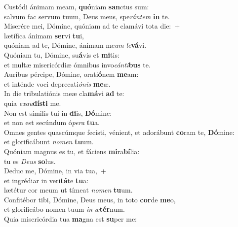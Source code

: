 \evenverse Custódi ánimam meam, \textbf{quó}niam \textbf{san}ctus sum:~\*\\
\evenverse salvum fac servum tuum, Deus meus, spe\textit{rán}\textit{tem} \textbf{in} te.\\
\oddverse Miserére mei, Dómine, quóniam ad te clamávi tota die:~+\\
\oddverse  lætífica ánimam \textbf{ser}vi \textbf{tu}i,~\*\\
\oddverse quóniam ad te, Dómine, ánimam me\textit{am} \textit{le}\textbf{vá}vi.\\
\evenverse Quóniam tu, Dómine, su\textbf{á}vis et \textbf{mi}tis:~\*\\
\evenverse et multæ misericórdiæ ómnibus invo\textit{cán}\textit{ti}\textbf{bus} te.\\
\oddverse Auribus pércipe, Dómine, orati\textbf{ó}nem \textbf{me}am:~\*\\
\oddverse et inténde voci deprecati\textit{ó}\textit{nis} \textbf{me}æ.\\
\evenverse In die tribulatiónis meæ cla\textbf{má}vi \textbf{ad} te:~\*\\
\evenverse quia \textit{e}\textit{xau}\textbf{dí}\textbf{sti} me.\\
\oddverse Non est símilis tui in \textbf{di}is, \textbf{Dó}mine:~\*\\
\oddverse et non est secúndum ó\textit{pe}\textit{ra} \textbf{tu}a.\\
\evenverse Omnes gentes quascúmque fecísti, vénient, et adorábunt \textbf{co}ram te, \textbf{Dó}mine:~\*\\
\evenverse et glorificábunt \textit{no}\textit{men} \textbf{tu}um.\\
\oddverse Quóniam magnus es tu, et fáciens \textbf{mi}ra\textbf{bí}lia:~\*\\
\oddverse tu es \textit{De}\textit{us} \textbf{so}lus.\\
\evenverse Deduc me, Dómine, in via tua,~+\\
\evenverse  et ingrédiar in veri\textbf{tá}te \textbf{tu}a:~\*\\
\evenverse lætétur cor meum ut tímeat \textit{no}\textit{men} \textbf{tu}um.\\
\oddverse Confitébor tibi, Dómine, Deus meus, in toto \textbf{cor}de \textbf{me}o,~\*\\
\oddverse et glorificábo nomen tuum \textit{in} \textit{æ}\textbf{tér}num.\\
\evenverse Quia misericórdia tua \textbf{ma}gna est \textbf{su}per me:~\*\\
